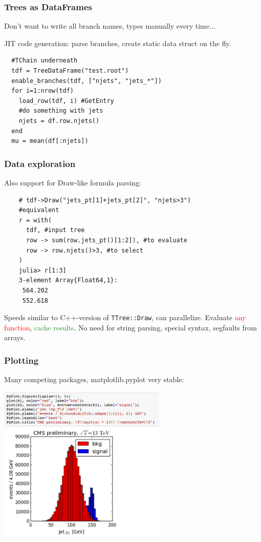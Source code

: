\documentclass[16pt]{beamer}
\begin{document}
\begin{frame}[fragile]
  \frametitle{Trees as DataFrames}
  \begin{centering}
  Don't want to write all branch names, types manually every time...
  \end{centering}

  JIT code generation: parse branches, create static data struct on the fly.

  \begin{lstlisting}
  #TChain underneath
  tdf = TreeDataFrame("test.root")
  enable_branches(tdf, ["njets", "jets_*"])
  for i=1:nrow(tdf)
    load_row(tdf, i) #GetEntry
    #do something with jets
    njets = df.row.njets()
  end
  mu = mean(df[:njets])
  \end{lstlisting}
  
\end{frame}

\begin{frame}[fragile]
  \frametitle{Data exploration}
  Also support for Draw-like formula parsing:
  \begin{lstlisting}
    # tdf->Draw("jets_pt[1]+jets_pt[2]", "njets>3")
    #equivalent
    r = with(
      tdf, #input tree
      row -> sum(row.jets_pt()[1:2]), #to evaluate
      row -> row.njets()>3, #to select
    )
    julia> r[1:3]
    3-element Array{Float64,1}:
     564.202
     552.618
  \end{lstlisting}
  Speeds similar to C++-version of \texttt{TTree::Draw}, can parallelize.
  Evaluate \textcolor{red}{any function}, \textcolor{ForestGreen}{cache results}.
  No need for string parsing, special syntax, segfaults from arrays.
\end{frame}

\begin{frame}[fragile]
  \frametitle{Plotting}
  Many competing packages, matplotlib.pyplot very stable:

  \begin{center}
    \includegraphics[width=8cm]{plot.png}
  \end{center}
\end{frame}
\end{document}
